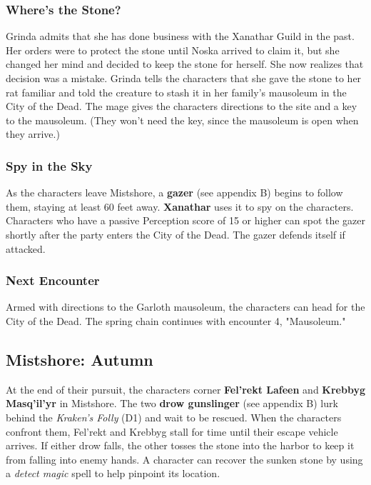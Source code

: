 \documentclass[10pt,a4paper,twoside,twocolumn,openany,nodeprecatedcode]{dndbook}
\begin{document}
\subsubsection{Where's the Stone?}
Grinda admits that she has done business with the Xanathar Guild in the past. Her orders were to protect the stone until Noska arrived to claim it, but she changed her mind and decided to keep the stone for herself. She now realizes that decision was a mistake.
Grinda tells the characters that she gave the stone to her rat familiar and told the creature to stash it in her family's mausoleum in the City of the Dead. The mage gives the characters directions to the site and a key to the mausoleum. (They won't need the key, since the mausoleum is open when they arrive.)
\subsubsection{Spy in the Sky}
As the characters leave Mistshore, a \textbf{gazer} (see appendix B) begins to follow them, staying at least 60 feet away. \textbf{Xanathar} uses it to spy on the characters. Characters who have a passive Perception score of 15 or higher can spot the gazer shortly after the party enters the City of the Dead. The gazer defends itself if attacked.
\subsubsection{Next Encounter}
Armed with directions to the Garloth mausoleum, the characters can head for the City of the Dead. The spring chain continues with encounter 4, "Mausoleum."
\subsection{Mistshore: Autumn}
At the end of their pursuit, the characters corner \textbf{Fel'rekt Lafeen} and \textbf{Krebbyg Masq'il'yr} in Mistshore. The two \textbf{drow gunslinger} (see appendix B) lurk behind the \textit{Kraken's Folly} (D1) and wait to be rescued. When the characters confront them, Fel'rekt and Krebbyg stall for time until their escape vehicle arrives. If either drow falls, the other tosses the stone into the harbor to keep it from falling into enemy hands. A character can recover the sunken stone by using a \textit{detect magic} spell to help pinpoint its location.
\end{document}
